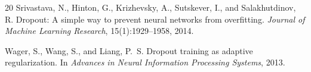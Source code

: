\documentclass{article}
\begin{document}
\begin{thebibliography}{20}
Srivastava, N., Hinton, G., Krizhevsky, A., Sutskever, I., and Salakhutdinov, R.
\newblock Dropout: A simple way to prevent neural networks from overfitting.
\newblock \emph{Journal of Machine Learning Research}, 15(1):1929--1958, 2014.

Wager, S., Wang, S., and Liang, P.~S.
\newblock Dropout training as adaptive regularization.
\newblock In \emph{Advances in Neural Information Processing Systems}, 2013.

\end{thebibliography}
\end{document}
